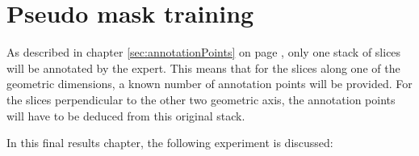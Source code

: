 \chapter{Pseudo mask training}
\par{
    As described in chapter \ref{sec:annotationPoints} on page \pageref{sec:annotationPoints}, only one stack of slices will be annotated by the expert.
    This means that for the slices along one of the geometric dimensions, a known number of annotation points will be provided.
    For the slices perpendicular to the other two geometric axis, the annotation points will have to be deduced from this original stack.
}
\par{
    In this final results chapter, the following experiment is discussed:

}

